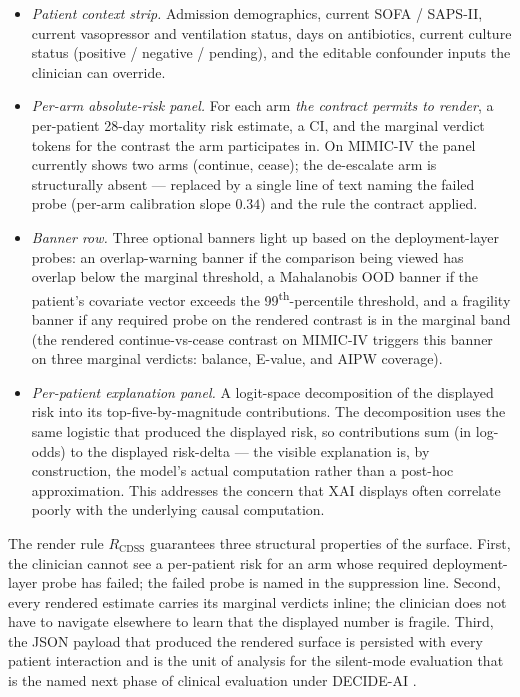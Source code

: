 \documentclass[11pt,a4paper]{article}
\begin{document}
\begin{itemize}[leftmargin=*,itemsep=2pt]
\item \emph{Patient context strip.} Admission demographics, current SOFA / SAPS-II, current vasopressor and ventilation status, days on antibiotics, current culture status (positive / negative / pending), and the editable confounder inputs the clinician can override.
\item \emph{Per-arm absolute-risk panel.} For each arm \emph{the contract permits to render}, a per-patient 28-day mortality risk estimate, a CI, and the marginal verdict tokens for the contrast the arm participates in. On MIMIC-IV the panel currently shows two arms (continue, cease); the de-escalate arm is structurally absent --- replaced by a single line of text naming the failed probe (per-arm calibration slope $0.34$) and the rule the contract applied.
\item \emph{Banner row.} Three optional banners light up based on the deployment-layer probes: an overlap-warning banner if the comparison being viewed has overlap below the marginal threshold, a Mahalanobis OOD banner if the patient's covariate vector exceeds the 99\textsuperscript{th}-percentile threshold, and a fragility banner if any required probe on the rendered contrast is in the marginal band (the rendered continue-vs-cease contrast on MIMIC-IV triggers this banner on three marginal verdicts: balance, E-value, and AIPW coverage).
\item \emph{Per-patient explanation panel.} A logit-space decomposition of the displayed risk into its top-five-by-magnitude contributions. The decomposition uses the same logistic that produced the displayed risk, so contributions sum (in log-odds) to the displayed risk-delta --- the visible explanation is, by construction, the model's actual computation rather than a post-hoc approximation. This addresses the \cite{clixm2025} concern that XAI displays often correlate poorly with the underlying causal computation.
\end{itemize}

The render rule $R_{\text{CDSS}}$ guarantees three structural properties of the surface. First, the clinician cannot see a per-patient risk for an arm whose required deployment-layer probe has failed; the failed probe is named in the suppression line. Second, every rendered estimate carries its marginal verdicts inline; the clinician does not have to navigate elsewhere to learn that the displayed number is fragile. Third, the JSON payload that produced the rendered surface is persisted with every patient interaction and is the unit of analysis for the silent-mode evaluation that is the named next phase of clinical evaluation under DECIDE-AI \cite{decideai2022}.
\end{document}

